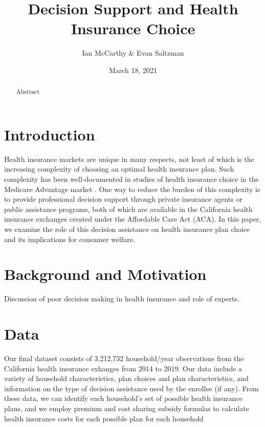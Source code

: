 \documentclass[12pt]{article}
\begin{document}
\title{Decision Support and Health Insurance Choice}
\author{Ian McCarthy \& Evan Saltzman}
\date{March 18, 2021}
\maketitle

\vspace{-2ex}
\begin{abstract}
\noindent Abstract
\end{abstract}

\clearpage

\section{Introduction}
\label{sec:introduction}

Health insurance markets are unique in many respects, not least of which is the increasing complexity of choosing an optimal health insurance plan. Such complexity has been well-documented in studies of health insurance choice in the Medicare Advantage market \citep{abaluck2011, ketcham2012, gruber2017}. One way to reduce the burden of this complexity is to provide professional decision support through private insurance agents or public assistance programs, both of which are available in the California health insurance exchanges created under the Affordable Care Act (ACA). In this paper, we examine the role of this decision assistance on health insurance plan choice and its implications for consumer welfare.

\section{Background and Motivation}
\label{sec:background-and-motivation}

Discussion of poor decision making in health insurance and role of experts.

\section{Data}
\label{sec:data}

Our final dataset consists of 3,212,732 household/year observations from the California health insurance exhanges from 2014 to 2019. Our data include a variety of household characteristics, plan choices and plan characteristics, and information on the type of decision assistance used by the enrollee (if any). From these data, we can identify each household's set of possible health insurance plans, and we employ premium and cost sharing subsidy formulas to calculate health insurance costs for each possible plan for each household
\end{document}
